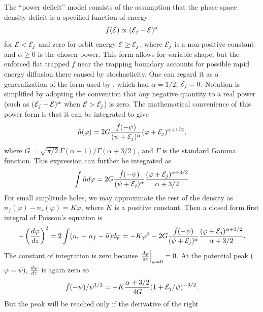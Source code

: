 \documentclass[aip,pop,article-title]{revtex4-2}
\def\energy{{\cal E}}
\begin{document}
The ``power deficit'' model\cite{Hutchinson2021a} consists of the assumption that the phase
space density deficit is a specified function of energy
\begin{equation}
  \tilde f(\energy) \propto (\energy_j-\energy)^\alpha
\end{equation}
for $\energy < \energy_j$ and zero for orbit energy
$\energy \ge \energy_j$, where $\energy_j$ is a non-positive constant
and $\alpha\ge 0$ is the chosen power.  This form allows for variable
shape, but the enforced flat trapped $f$ near the trapping boundary
accounts for possible rapid energy diffusion there caused by
stochasticity\cite{Hutchinson2020}. One can regard it as a
generalization of the form used by \citet{Bohm1949}, which had
$\alpha=1/2$, $\energy_j=0$. Notation is simplified by adopting the
convention that any negative quantity to a real power (such as
$(\energy_j-\energy)^\alpha$ when $\energy > \energy_j$) is zero. The
mathematical convenience of this power form is that it can be
integrated to give
\begin{equation}
\tilde n(\varphi)=2 G {\tilde f(-\psi)\over
(\psi+\energy_j)^\alpha  }(\varphi+\energy_j)^{\alpha+1/2},
\end{equation}
where $G=\sqrt{\pi/2}\,\Gamma(\alpha+1)/\Gamma(\alpha+3/2)$, and
$\Gamma$ is the standard Gamma function. This expression can further
be integrated as 
\begin{equation}
  \int \tilde n d\varphi=2 G {\tilde f(-\psi)\over
(\psi+\energy_j)^\alpha  }{(\varphi+\energy_j)^{\alpha+3/2}\over
\alpha +3/2}
\end{equation}
For small amplitude holes, we may approximate the rest of the density
as $n_f(\varphi)-n_r(\varphi)=K\varphi$, where $K$ is a positive constant. 
Then a closed form first integral of Poisson's equation is
\begin{equation}
  \label{firstint}
  -\left({d\varphi\over dz}\right)^2=2\int (n_r-n_f-\tilde n)d\varphi
=-K\varphi^2-2 G {\tilde f(-\psi)\over
(\psi+\energy_j)^\alpha  }{(\varphi+\energy_j)^{\alpha+3/2}\over
\alpha +3/2}.
\end{equation}
The constant of integration is zero because $\left.d\varphi\over dz\right|_{\varphi=0}=0$.
At the potential peak ($\varphi=\psi$), ${d\varphi\over dz}$ is again zero so 
\begin{equation}
  \label{tildefpsi}
  \tilde f(-\psi)/\psi^{1/2} = -K{\alpha+3/2\over4G} (1+\energy_j/\psi)^{-3/2}.
\end{equation}
But the peak will be reached only if the derivative of the right
\end{document}
